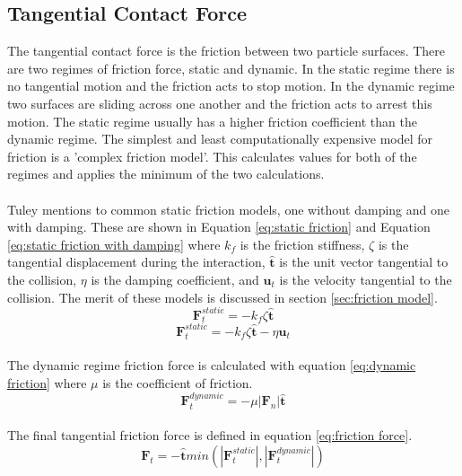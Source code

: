 \documentclass[10pt,a4paper,titlepage]{report}
\begin{document}
\subsection{Tangential Contact Force}
\label{sec:tangential contact force}
The tangential contact force is the friction between two particle surfaces. There are two regimes of friction force, static and dynamic. In the static regime there is no tangential motion and the friction acts to stop motion. In the dynamic regime two surfaces are sliding across one another and the friction acts to arrest this motion. The static regime usually has a higher friction coefficient than the dynamic regime. The simplest and least computationally expensive model for friction is a 'complex friction model'. This calculates values for both of the regimes and applies the minimum of the two calculations.\cite{tuley}
\\\\Tuley\cite{tuley} mentions to common static friction models, one without damping and one with damping. These are shown in Equation \ref{eq:static friction} and Equation \ref{eq:static friction with damping} where $k_f$ is the friction stiffness, $\zeta$ is the tangential displacement during the interaction, $\mathbf{\hat{t}}$ is the unit vector tangential to the collision, $\eta$ is the damping coefficient, and $\mathbf{u}_t$ is the velocity tangential to the collision. The merit of these models is discussed in section \ref{sec:friction model}.
\begin{equation}
\mathbf{F}_{t}^{static} = - k_{f} \zeta \mathbf{\hat{t}}
\label{eq:static friction}
\end{equation}
\begin{equation}
\mathbf{F}_{t}^{static} = - k_{f} \zeta \mathbf{\hat{t}} - \eta \mathbf{u}_t
\label{eq:static friction with damping}
\end{equation}
\\The dynamic regime friction force is calculated with equation \ref{eq:dynamic friction} where $\mu$ is the coefficient of friction.
\begin{equation}
\mathbf{F}_{t}^{dynamic} = - \mu |\mathbf{F}_{n}| \mathbf{\hat{t}}
\label{eq:dynamic friction}
\end{equation}
\\The final tangential friction force is defined in equation \ref{eq:friction force}.
\begin{equation}
\mathbf{F}_{t} = -\mathbf{\hat{t}}min(|\mathbf{F}_{t}^{static}|, |\mathbf{F}_{t}^{dynamic}|)
\label{eq:friction force}
\end{equation}
\end{document}
